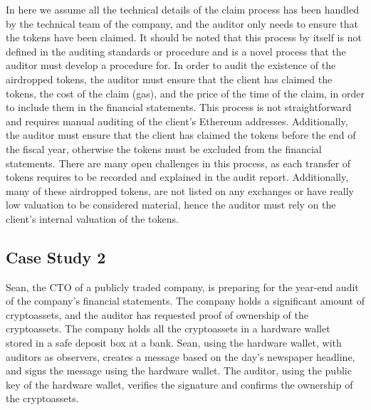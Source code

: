 In here we assume all the technical details of the claim process has been handled by the technical team of the company, and the auditor only needs to ensure that the tokens have been claimed. It should be noted that this process by itself is not defined in the auditing standards or procedure and is a novel process that the auditor must develop a procedure for. In order to audit the existence of the airdropped tokens, the auditor must ensure that the client has claimed the tokens, the cost of the claim (gas), and the price of the time of the claim, in order to include them in the financial statements.  This process is not straightforward and requires manual auditing of the client's Ethereum addresses. Additionally, the auditor must ensure that the client has claimed the tokens before the end of the fiscal year, otherwise the tokens must be excluded from the financial statements. There are many open challenges in this process, as each transfer of tokens requires to be recorded and explained in the audit report. Additionally, many of these airdropped tokens, are not listed on any exchanges or have really low valuation to be considered material, hence the auditor must rely on the client's internal valuation of the tokens. 







\subsection{Case Study 2} \label{sec:auditing:case-studies:ownership} %
Sean, the CTO of a publicly traded company, is preparing for the year-end audit of the company's financial statements. The company holds a significant amount of cryptoassets, and the auditor has requested proof of ownership of the cryptoassets. The company holds all the cryptoassets in a hardware wallet~\cite{EBSC15} stored in a safe deposit box at a bank. Sean, using the hardware wallet, with auditors as observers, creates a message based on the day's newspaper headline, and signs the message using the hardware wallet. The auditor, using the public key of the hardware wallet, verifies the signature and confirms the ownership of the cryptoassets.

